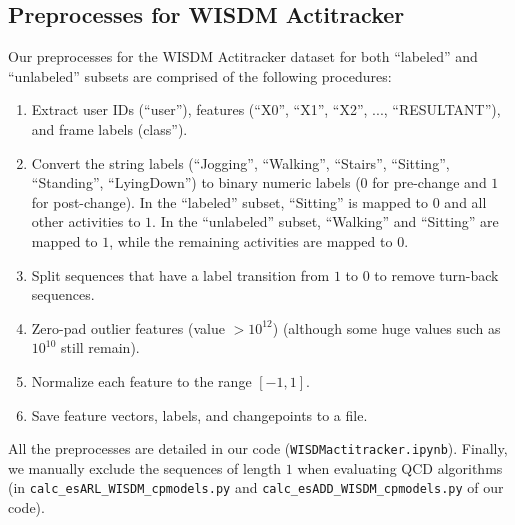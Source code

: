 \documentclass{article}
\theoremstyle{plain}
\theoremstyle{definition}
\theoremstyle{remark}
\begin{document}
\subsection{Preprocesses for WISDM Actitracker} \label{app:Preprocesses for WISDM Actitracker}
Our preprocesses for the WISDM Actitracker dataset for both ``labeled'' and ``unlabeled'' subsets are comprised of the following procedures:
\begin{enumerate}
    \item Extract user IDs (``user''), features (``X0'', ``X1'', ``X2'', ..., ``RESULTANT''), and frame labels (class'').
    \item Convert the string labels (``Jogging'', ``Walking'', ``Stairs'', ``Sitting'', ``Standing'', ``LyingDown'') to binary numeric labels ($0$ for pre-change and $1$ for post-change). In the ``labeled'' subset, ``Sitting'' is mapped to $0$ and all other activities to $1$. In the ``unlabeled'' subset, ``Walking'' and ``Sitting'' are mapped to $1$, while the remaining activities are mapped to $0$.
    \item Split sequences that have a label transition from $1$ to $0$ to remove turn-back sequences.
    \item Zero-pad outlier features (value $> 10^{12}$) (although some huge values such as $10^{10}$ still remain).
    \item Normalize each feature to the range $[-1, 1]$.
    \item Save feature vectors, labels, and changepoints to a file.
\end{enumerate}
All the preprocesses are detailed in our code (\texttt{WISDMactitracker.ipynb}).
Finally, we manually exclude the sequences of length $1$ when evaluating QCD algorithms (in \texttt{calc\_esARL\_WISDM\_cpmodels.py} and \texttt{calc\_esADD\_WISDM\_cpmodels.py} of our code).
\end{document}
